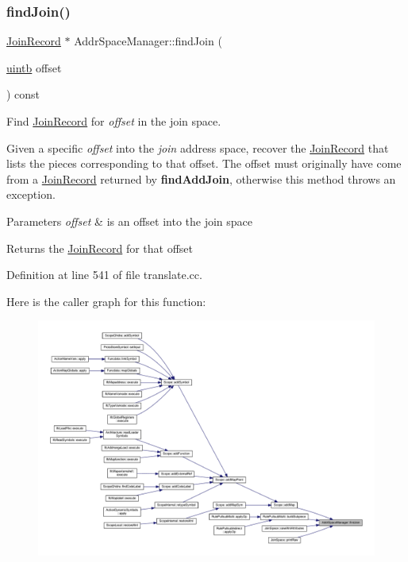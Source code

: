 \subsubsection{\texorpdfstring{findJoin()}{findJoin()}}
{\footnotesize\ttfamily \mbox{\hyperlink{class_join_record}{Join\+Record}} $\ast$ Addr\+Space\+Manager\+::find\+Join (\begin{DoxyParamCaption}\item[{\mbox{\hyperlink{types_8h_a2db313c5d32a12b01d26ac9b3bca178f}{uintb}}}]{offset }\end{DoxyParamCaption}) const}



Find \mbox{\hyperlink{class_join_record}{Join\+Record}} for {\itshape offset} in the join space. 

Given a specific {\itshape offset} into the {\itshape join} address space, recover the \mbox{\hyperlink{class_join_record}{Join\+Record}} that lists the pieces corresponding to that offset. The offset must originally have come from a \mbox{\hyperlink{class_join_record}{Join\+Record}} returned by {\bfseries{find\+Add\+Join}}, otherwise this method throws an exception. 
\begin{DoxyParams}{Parameters}
{\em offset} & is an offset into the join space \\
\hline
\end{DoxyParams}
\begin{DoxyReturn}{Returns}
the \mbox{\hyperlink{class_join_record}{Join\+Record}} for that offset 
\end{DoxyReturn}


Definition at line 541 of file translate.\+cc.

Here is the caller graph for this function\+:
\nopagebreak
\begin{figure}[H]
\begin{center}
\leavevmode
\includegraphics[width=350pt]{class_addr_space_manager_adff0f9e662ebffdf724dca82b6b544bb_icgraph}
\end{center}
\end{figure}
\mbox{\label{class_addr_space_manager_aadd44852a41fe18966cce35b5abd15de}} 
